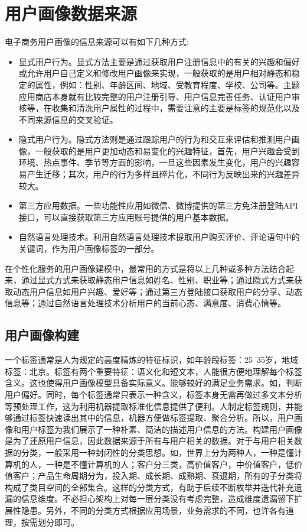 		\section{用户画像数据来源}	    
	    电子商务用户画像的信息来源可以有如下几种方式:
	    \begin{itemize}
	    \item 显式用户行为。显式方法主要是通过获取用户注册信息中的有关的兴趣和偏好或允许用户自己定义和修改用户画像来实现，一般获取的是用户相对静态和稳定的属性，例如：性别、年龄区间、地域、受教育程度、学校、公司等。主题应用商店本身就有比较完整的用户注册引导、用户信息完善任务、认证用户审核等，在收集和清洗用户属性的过程中，需要注意的主要是标签的规范化以及不同来源信息的交叉验证。
	    \item 隐式用户行为。隐式方法则是通过跟踪用户的行为和交互来评估和推测用户画像，一般获取的是用户更加动态和易变化的兴趣特征，首先，用户兴趣会受到环境、热点事件、季节等方面的影响，一旦这些因素发生变化，用户的兴趣容易产生迁移；其次，用户的行为多样且碎片化，不同行为反映出来的兴趣差异较大。
	    \item 第三方应用数据。一些功能性应用如微信、微博提供的第三方免注册登陆API接口，可以直接获取第三方应用账号提供的用户基本数据。
	    \item 自然语言处理技术。利用自然语言处理技术提取用户购买评价、评论语句中的关键词，作为用户画像标签的一部分。
	    \end{itemize}

	    在个性化服务的用户画像建模中，最常用的方式是将以上几种或多种方法结合起来，通过显式方式来获取静态用户信息如姓名、性别、职业等；通过隐式方式来获取动态用户信息如用户兴趣、爱好等；通过第三方登陆接口获取用户的分享、动态信息等；通过自然语言处理技术分析用户的当前心态、满意度、消费心情等。

		\subsection{用户画像构建}
		一个标签通常是人为规定的高度精炼的特征标识，如年龄段标签：25~35岁，地域标签：北京。标签有两个重要特征：语义化和短文本，人能很方便地理解每个标签含义。这也使得用户画像模型具备实际意义。能够较好的满足业务需求。如，判断用户偏好。同时，每个标签通常只表示一种含义，标签本身无需再做过多文本分析等预处理工作，这为利用机器提取标准化信息提供了便利。人制定标签规则，并能够通过标签快速读出其中的信息，机器方便做标签提取、聚合分析。所以，用户画像和用户标签为我们展示了一种朴素、简洁的描述用户信息的方法。构建用户画像是为了还原用户信息，因此数据来源于所有与用户相关的数据。对于与用户相关数据的分类，一般采用一种封闭性的分类思想。如，世界上分为两种人，一种是懂计算机的人，一种是不懂计算机的人；客户分三类，高价值客户，中价值客户，低价值客户；产品生命周期分为，投入期、成长期、成熟期、衰退期，所有的子分类将构成了类目空间的全部集合。这样的分类方式，有助于后续不断枚举并迭代补充遗漏的信息维度。不必担心架构上对每一层分类没有考虑完整，造成维度遗漏留下扩展性隐患。另外，不同的分类方式根据应用场景，业务需求的不同，也许各有道理，按需划分即可。

